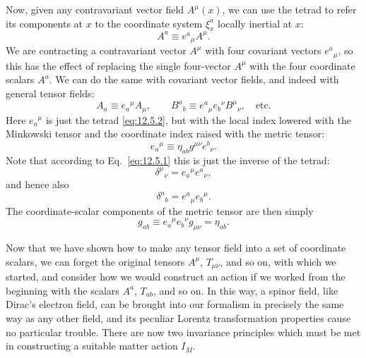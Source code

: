 Now, given any contravariant vector field \(A^\mu(x)\), we can use the tetrad
to refer its components at \(x\) to the coordinate system \(\xi_x^a\)
locally inertial at \(x\):
\begin{equation}
  A^a\equiv e^a{}_\mu A^\mu.
  \tag{12.5.4}\label{eq:12.5.4}
\end{equation}
We are contracting a contravariant vector \(A^\mu\) with four covariant
vectors \(e^a{}_\mu\), so this has the effect of replacing the single
four-vector \(A^\mu\) with the four coordinate scalars \(A^a\). We can do the
same with covariant vector fields, and indeed with general tensor fields:
\begin{equation}
  A_a\equiv e_a{}^\mu A_\mu,
  \qquad
  B^a{}_b\equiv e^a{}_\mu e_b{}^\nu B^\mu{}_\nu,
  \quad\text{etc.}
  \tag{12.5.5}\label{eq:12.5.5}
\end{equation}
Here \(e_a{}^\mu\) is just the tetrad \eqref{eq:12.5.2}, but with the local
index lowered with the Minkowski tensor and the coordinate index raised with
the metric tensor:
\begin{equation}
  e_a{}^\mu
  \equiv
  \eta_{ab}g^{\mu\nu}e^b{}_\nu.
  \tag{12.5.6}\label{eq:12.5.6}
\end{equation}
Note that according to Eq.~\eqref{eq:12.5.1} this is just the inverse of the
tetrad:
\begin{equation}
  \delta^\mu{}_\nu=e_a{}^\mu e^a{}_\nu,
  \tag{12.5.7}\label{eq:12.5.7}
\end{equation}
and hence also
\begin{equation}
  \delta^a{}_b=e^a{}_\mu e_b{}^\mu.
  \tag{12.5.8}\label{eq:12.5.8}
\end{equation}
The coordinate-scalar components of the metric tensor are then simply
\begin{equation}
  g_{ab}
  \equiv
  e_a{}^\mu e_b{}^\nu g_{\mu\nu}
  =
  \eta_{ab}.
  \tag{12.5.9}\label{eq:12.5.9}
\end{equation}

Now that we have shown how to make any tensor field into a set of coordinate
scalars, we can forget the original tensors \(A^\mu\), \(T_{\mu\nu}\), and so
on, with which we started, and consider how we would construct an action if
we worked from the beginning with the scalars \(A^a\), \(T_{ab}\), and so on.
In this way, a spinor field, like Dirac's electron field, can be brought into
our formalism in precisely the same way as any other field, and its peculiar
Lorentz transformation properties cause no particular trouble. There are now
two invariance principles which must be met in constructing a suitable matter
action \(I_M\).

